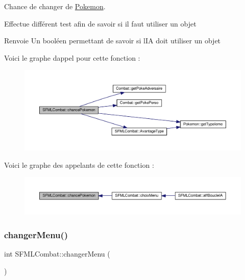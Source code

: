 Chance de changer de \hyperlink{class_pokemon}{Pokemon}. 

Effectue différent test afin de savoir si il faut utiliser un objet \begin{DoxyReturn}{Renvoie}
Un booléen permettant de savoir si l\textquotesingle{}IA doit utiliser un objet 
\end{DoxyReturn}
Voici le graphe d\textquotesingle{}appel pour cette fonction \+:\nopagebreak
\begin{figure}[H]
\begin{center}
\leavevmode
\includegraphics[width=350pt]{class_s_f_m_l_combat_a4ba9a6e1f0c91eb425ac83649e443375_cgraph}
\end{center}
\end{figure}
Voici le graphe des appelants de cette fonction \+:\nopagebreak
\begin{figure}[H]
\begin{center}
\leavevmode
\includegraphics[width=350pt]{class_s_f_m_l_combat_a4ba9a6e1f0c91eb425ac83649e443375_icgraph}
\end{center}
\end{figure}
\mbox{\label{class_s_f_m_l_combat_ab856672c59db95d55c7c28cd3a1eee93}} 
\subsubsection{\texorpdfstring{changer\+Menu()}{changerMenu()}}
{\footnotesize\ttfamily int S\+F\+M\+L\+Combat\+::changer\+Menu (\begin{DoxyParamCaption}{ }\end{DoxyParamCaption})\hspace{0.3cm}{\ttfamily [private]}}

